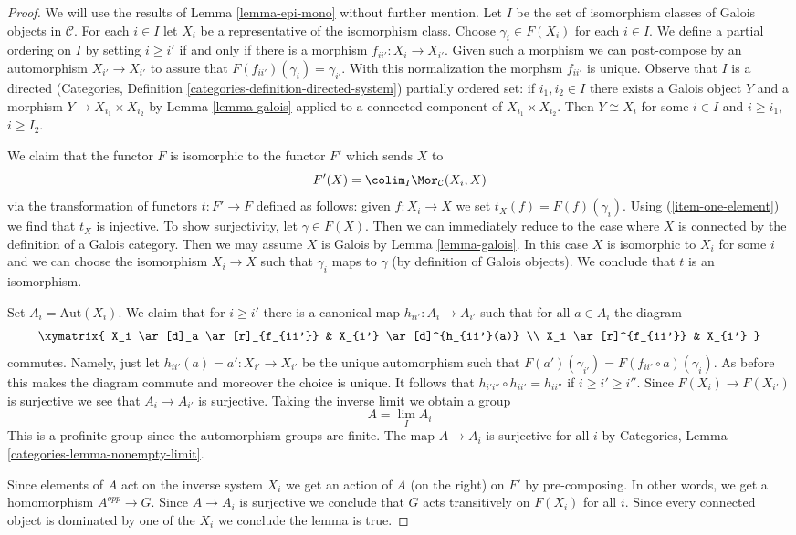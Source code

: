 \begin{proof}
We will use the results of Lemma \ref{lemma-epi-mono} without further mention.
Let $I$ be the set of isomorphism classes of Galois objects in $\mathcal{C}$.
For each $i \in I$ let $X_i$ be a representative of the isomorphism class.
Choose $\gamma_i \in F(X_i)$ for each $i \in I$.
We define a partial ordering on $I$ by setting $i \geq i'$ if
and only if there is a morphism $f_{ii'} : X_i \to X_{i'}$.
Given such a morphism we can post-compose by an automorphism
$X_{i'} \to X_{i'}$ to assure that $F(f_{ii'})(\gamma_i) = \gamma_{i'}$.
With this normalization the morphsm $f_{ii'}$ is unique.
Observe that $I$ is a directed
(Categories, Definition \ref{categories-definition-directed-system})
partially ordered set:
if $i_1, i_2 \in I$ there exists a Galois object $Y$ and a morphism
$Y \to X_{i_1} \times X_{i_2}$ by Lemma \ref{lemma-galois} applied
to a connected component of $X_{i_1} \times X_{i_2}$.
Then $Y \cong X_i$ for some $i \in I$ and $i \geq i_1$, $i \geq I_2$.

\medskip\noindent
We claim that the functor $F$ is isomorphic to the functor $F'$
which sends $X$ to
$$
F'(X) = \colim_I \Mor_\mathcal{C}(X_i, X)
$$
via the transformation of functors $t : F' \to F$ defined as follows:
given $f : X_i \to X$ we set $t_X(f) = F(f)(\gamma_i)$.
Using (\ref{item-one-element}) we find that $t_X$ is injective.
To show surjectivity, let $\gamma \in F(X)$. Then we can immediately
reduce to the case where $X$ is connected by the definition of
a Galois category. Then we may assume $X$ is Galois by
Lemma \ref{lemma-galois}. In this case $X$ is isomorphic to $X_i$
for some $i$ and we can choose the isomorphism $X_i \to X$ such
that $\gamma_i$ maps to $\gamma$ (by definition of Galois objects).
We conclude that $t$ is an isomorphism.

\medskip\noindent
Set $A_i = \text{Aut}(X_i)$.
We claim that for $i \geq i'$ there is a canonical map
$h_{ii'} : A_i \to A_{i'}$ such that for all $a \in A_i$
the diagram
$$
\xymatrix{
X_i \ar[d]_a \ar[r]_{f_{ii'}} & X_{i'} \ar[d]^{h_{ii'}(a)} \\
X_i \ar[r]^{f_{ii'}} & X_{i'}
}
$$
commutes. Namely, just let $h_{ii'}(a) = a' : X_{i'} \to X_{i'}$
be the unique automorphism such that
$F(a')(\gamma_{i'}) = F(f_{ii'} \circ a)(\gamma_i)$.
As before this makes the diagram commute and moreover the choice
is unique.
It follows that
$h_{i'i''} \circ h_{ii'} = h_{ii''}$
if $i \geq i' \geq i''$.
Since $F(X_i) \to F(X_{i'})$ is surjective we see that
$A_i \to A_{i'}$ is surjective.
Taking the inverse limit we obtain a group
$$
A = \lim_I A_i
$$
This is a profinite group since the automorphism groups are finite.
The map $A \to A_i$ is surjective for all $i$ by
Categories, Lemma \ref{categories-lemma-nonempty-limit}.

\medskip\noindent
Since elements of $A$ act on the inverse system $X_i$ we get an action of
$A$ (on the right) on $F'$ by pre-composing. In other words, we get
a homomorphism $A^{opp} \to G$. Since $A \to A_i$ is surjective we conclude
that $G$ acts transitively on $F(X_i)$ for all $i$. Since every connected
object is dominated by one of the $X_i$ we conclude the lemma is true.
\end{proof}

